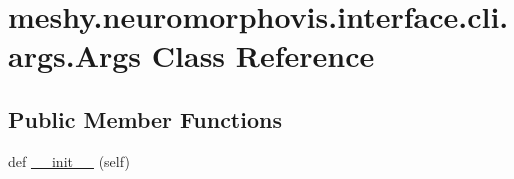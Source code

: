\hypertarget{classmeshy_1_1neuromorphovis_1_1interface_1_1cli_1_1args_1_1Args}{}\section{meshy.\+neuromorphovis.\+interface.\+cli.\+args.\+Args Class Reference}
\label{classmeshy_1_1neuromorphovis_1_1interface_1_1cli_1_1args_1_1Args}


 


\subsection*{Public Member Functions}
\begin{DoxyCompactItemize}
\item 
def \hyperlink{classmeshy_1_1neuromorphovis_1_1interface_1_1cli_1_1args_1_1Args_a6ca38d508daa56522501850e350f6323}{\+\_\+\+\_\+init\+\_\+\+\_\+} (self)\hypertarget{classmeshy_1_1neuromorphovis_1_1interface_1_1cli_1_1args_1_1Args_a6ca38d508daa56522501850e350f6323}{}\label{classmeshy_1_1neuromorphovis_1_1interface_1_1cli_1_1args_1_1Args_a6ca38d508daa56522501850e350f6323}

\end{DoxyCompactItemize}
